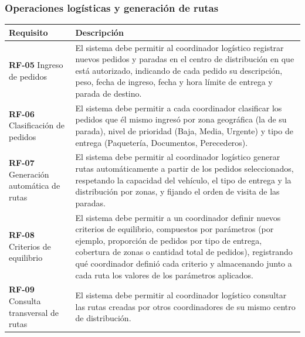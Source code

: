 \documentclass[11pt,a4paper]{article}
\begin{document}
\subsubsection{Operaciones logísticas y generación de rutas}
\begin{longtable}{P{0.30\textwidth}P{0.64\textwidth}}
\toprule
\textbf{Requisito} & \textbf{Descripción}\\ \midrule
\endhead
\textbf{RF-05} Ingreso de pedidos & El sistema debe permitir al coordinador logístico registrar nuevos pedidos y paradas en el centro de distribución en que está autorizado, indicando de cada pedido su descripción, peso, fecha de ingreso, fecha y hora límite de entrega y parada de destino.\\
\textbf{RF-06} Clasificación de pedidos & El sistema debe permitir a cada coordinador clasificar los pedidos que él mismo ingresó por zona geográfica (la de su parada), nivel de prioridad (Baja, Media, Urgente) y tipo de entrega (Paquetería, Documentos, Perecederos).\\
\textbf{RF-07} Generación automática de rutas & El sistema debe permitir al coordinador logístico generar rutas automáticamente a partir de los pedidos seleccionados, respetando la capacidad del vehículo, el tipo de entrega y la distribución por zonas, y fijando el orden de visita de las paradas.\\
\textbf{RF-08} Criterios de equilibrio & El sistema debe permitir a un coordinador definir nuevos criterios de equilibrio, compuestos por parámetros (por ejemplo, proporción de pedidos por tipo de entrega, cobertura de zonas o cantidad total de pedidos), registrando qué coordinador definió cada criterio y almacenando junto a cada ruta los valores de los parámetros aplicados.\\
\textbf{RF-09} Consulta transversal de rutas & El sistema debe permitir al coordinador logístico consultar las rutas creadas por otros coordinadores de su mismo centro de distribución.\\
\bottomrule
\end{longtable}
\end{document}
